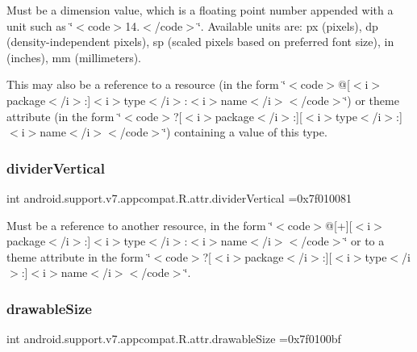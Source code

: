 Must be a dimension value, which is a floating point number appended with a unit such as \char`\"{}$<$code$>$14.\+5sp$<$/code$>$\char`\"{}. Available units are\+: px (pixels), dp (density-\/independent pixels), sp (scaled pixels based on preferred font size), in (inches), mm (millimeters). 

This may also be a reference to a resource (in the form \char`\"{}$<$code$>$@\mbox{[}$<$i$>$package$<$/i$>$\+:\mbox{]}$<$i$>$type$<$/i$>$\+:$<$i$>$name$<$/i$>$$<$/code$>$\char`\"{}) or theme attribute (in the form \char`\"{}$<$code$>$?\mbox{[}$<$i$>$package$<$/i$>$\+:\mbox{]}\mbox{[}$<$i$>$type$<$/i$>$\+:\mbox{]}$<$i$>$name$<$/i$>$$<$/code$>$\char`\"{}) containing a value of this type. \mbox{\label{classandroid_1_1support_1_1v7_1_1appcompat_1_1R_1_1attr_aa203492b19a06c186b417263d520f4e2}} 
\subsubsection{\texorpdfstring{divider\+Vertical}{dividerVertical}}
{\footnotesize\ttfamily int android.\+support.\+v7.\+appcompat.\+R.\+attr.\+divider\+Vertical =0x7f010081\hspace{0.3cm}{\ttfamily [static]}}

Must be a reference to another resource, in the form \char`\"{}$<$code$>$@\mbox{[}+\mbox{]}\mbox{[}$<$i$>$package$<$/i$>$\+:\mbox{]}$<$i$>$type$<$/i$>$\+:$<$i$>$name$<$/i$>$$<$/code$>$\char`\"{} or to a theme attribute in the form \char`\"{}$<$code$>$?\mbox{[}$<$i$>$package$<$/i$>$\+:\mbox{]}\mbox{[}$<$i$>$type$<$/i$>$\+:\mbox{]}$<$i$>$name$<$/i$>$$<$/code$>$\char`\"{}. \mbox{\label{classandroid_1_1support_1_1v7_1_1appcompat_1_1R_1_1attr_a3b065ae622136249bbdcb92a222420b6}} 
\subsubsection{\texorpdfstring{drawable\+Size}{drawableSize}}
{\footnotesize\ttfamily int android.\+support.\+v7.\+appcompat.\+R.\+attr.\+drawable\+Size =0x7f0100bf\hspace{0.3cm}{\ttfamily [static]}}

